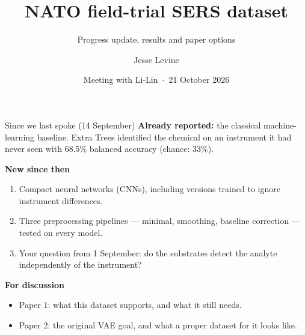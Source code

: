 \documentclass[aspectratio=169,10pt]{beamer}
\title{NATO field-trial SERS dataset}
\subtitle{Progress update, results and paper options}
\author{Jesse Levine}
\institute{National Research Council Canada}
\date{Meeting with Li-Lin \,$\cdot$\, 21 October 2026}
\begin{document}
\begin{frame}[plain]
\titlepage
\end{frame}

\begin{frame}{Since we last spoke (14 September)}
\textbf{Already reported:} the classical machine-learning baseline. Extra Trees identified the chemical on an instrument it had never seen with 68.5\% balanced accuracy (chance: 33\%).

\vspace{0.6em}
\textbf{New since then}
\begin{enumerate}
  \item Compact neural networks (CNNs), including versions trained to ignore instrument differences.
  \item Three preprocessing pipelines --- minimal, smoothing, baseline correction --- tested on every model.
  \item Your question from 1 September: do the substrates detect the analyte independently of the instrument?
\end{enumerate}

\vspace{0.6em}
\textbf{For discussion}
\begin{itemize}
  \item Paper 1: what this dataset supports, and what it still needs.
  \item Paper 2: the original VAE goal, and what a proper dataset for it looks like.
\end{itemize}
\end{frame}
\end{document}
